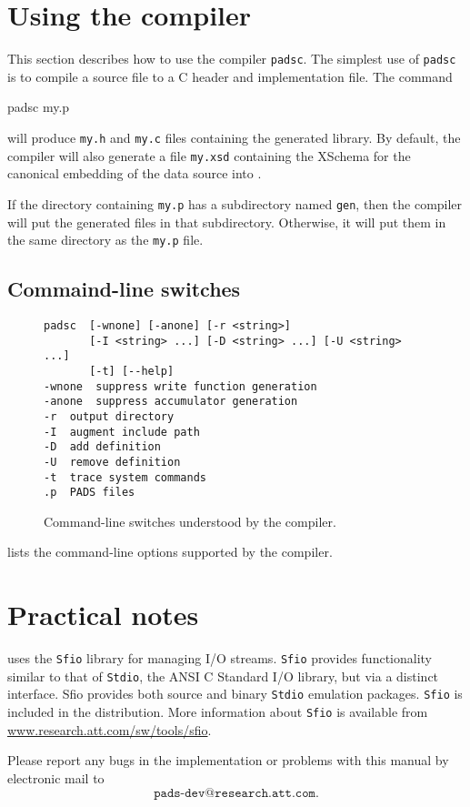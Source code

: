 \section{Using the \PADS{} compiler}
This section describes how to use the \PADS{} compiler \texttt{padsc}.
The simplest use of \texttt{padsc} is to compile a \PADSL{} source file
to a C header and implementation file.  The command
\begin{centercode}
padsc my.p
\end{centercode} %
will produce \texttt{my.h} and \texttt{my.c} files containing the
generated library.  By default, the compiler will also generate a file
\texttt{my.xsd} containing the XSchema for the \PADS{} canonical
embedding of the data source into \xml{}.

If the directory containing \texttt{my.p} has a subdirectory named
\texttt{gen}, then the compiler will put the generated files in that
subdirectory.  Otherwise, it will put them in the same directory as
the \texttt{my.p} file.

\subsection{Commaind-line switches}
\begin{figure}
\begin{center}
\begin{verbatim}
padsc  [-wnone] [-anone] [-r <string>] 
       [-I <string> ...] [-D <string> ...] [-U <string> ...] 
       [-t] [--help]
-wnone	suppress write function generation
-anone	suppress accumulator generation
-r	output directory
-I	augment include path
-D	add definition
-U	remove definition
-t	trace system commands
.p	PADS files
\end{verbatim}
\caption{Command-line switches understood by the \pads{} compiler.}
\label{figure:intro-switches}
\end{center}
\end{figure}
 lists the command-line options
supported by the \pads{} compiler.



\section{Practical notes}
\pads{} uses the \texttt{Sfio} library for managing I/O
streams. \texttt{Sfio} provides functionality similar to that of
\texttt{Stdio}, the ANSI C Standard I/O library, but via a distinct
interface.  Sfio provides both source and binary \texttt{Stdio}
emulation packages. \texttt{Sfio} is included in the \pads{}
distribution.  More information about \texttt{Sfio} is available from
\url{www.research.att.com/sw/tools/sfio}.


Please report any bugs in the \PADS{} implementation or problems with
this manual by electronic mail to 
\[
\texttt{pads-dev@research.att.com}.
\]